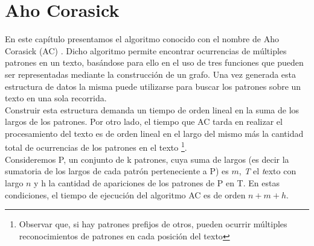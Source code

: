 
\chapter{Aho Corasick} %

\label{Chapter2}


En este capítulo presentamos el algoritmo conocido con el nombre de Aho Corasick (AC) \cite{AC75}. Dicho algoritmo permite encontrar ocurrencias de múltiples patrones en un texto, basándose para ello en el uso de tres funciones que pueden ser representadas mediante la construcción de un grafo. Una vez generada esta estructura de datos la misma puede utilizarse para buscar los patrones sobre un texto en una sola recorrida.\\
Construir esta estructura demanda un tiempo de orden lineal en la suma de los largos de los patrones. Por otro lado, el tiempo que AC tarda en realizar el procesamiento del texto es de orden lineal en el largo del mismo más la cantidad total de ocurrencias de los patrones en el texto {\footnote{Observar que, si hay patrones prefijos de otros, pueden ocurrir múltiples reconocimientos de patrones en cada posición del texto}}.\\ Consideremos P, un conjunto de k patrones, cuya suma de largos (es decir la sumatoria de los largos de cada patrón perteneciente a P) es $m$, {\it T} el {\emph texto} con largo $n$ y h la cantidad de apariciones de los patrones de P en T. En estas condiciones, el tiempo de ejecución del algoritmo AC es de orden $n + m + h$. \\

